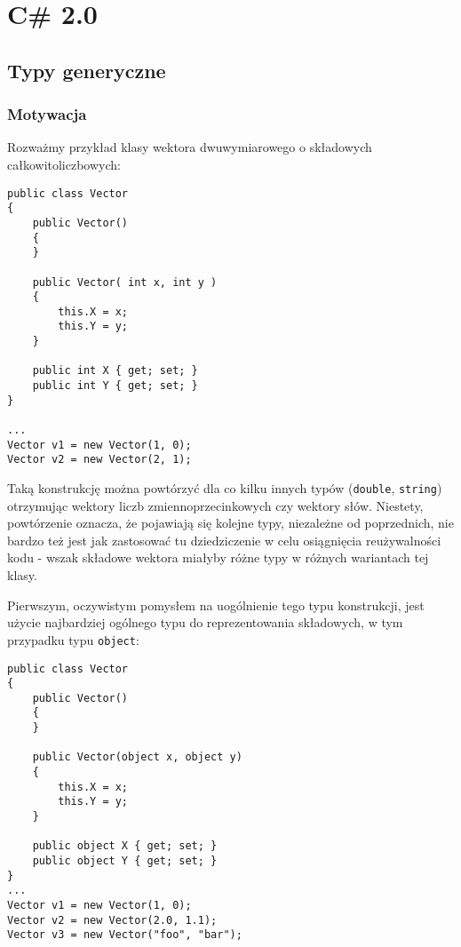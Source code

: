 ﻿\section{C\# 2.0}

\subsection{Typy generyczne}

\subsubsection{Motywacja}

Rozważmy przykład klasy wektora dwuwymiarowego o składowych całkowitoliczbowych:

\begin{scriptsize}
\begin{verbatim}
public class Vector
{
    public Vector()
    {
    }

    public Vector( int x, int y )
    {
        this.X = x;
        this.Y = y;
    }

    public int X { get; set; }
    public int Y { get; set; }
}

...
Vector v1 = new Vector(1, 0);
Vector v2 = new Vector(2, 1);
\end{verbatim}
\end{scriptsize}

Taką konstrukcję można powtórzyć dla co kilku innych typów ({\tt double}, {\tt string}) otrzymując wektory liczb
zmiennoprzecinkowych czy wektory słów. Niestety, powtórzenie oznacza, że pojawiają się kolejne typy, niezależne od poprzednich,
nie bardzo też jest jak zastosować tu dziedziczenie w celu osiągnięcia reużywalności kodu - wszak składowe wektora miałyby
różne typy w różnych wariantach tej klasy.

Pierwszym, oczywistym pomysłem na uogólnienie tego typu konstrukcji, jest użycie najbardziej ogólnego typu do
reprezentowania składowych, w tym przypadku typu {\tt object}:

\begin{scriptsize}
\begin{verbatim}
public class Vector
{
    public Vector()
    {
    }

    public Vector(object x, object y)
    {
        this.X = x;
        this.Y = y;
    }

    public object X { get; set; }
    public object Y { get; set; }
}
...
Vector v1 = new Vector(1, 0);
Vector v2 = new Vector(2.0, 1.1);
Vector v3 = new Vector("foo", "bar");
\end{verbatim}
\end{scriptsize}

